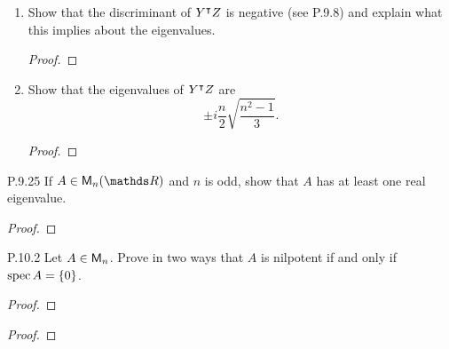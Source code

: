 \documentclass{../homework}
\begin{document}
\begin{problems}
\begin{enumerate}
    \begin{solution}
      \begin{proof}

      \end{proof}
    \end{solution}

  \item Show that the discriminant of \(Y^\intercal Z\) is negative
    (see P.9.8) and explain what this implies about the eigenvalues.

    \begin{solution}
      \begin{proof}

      \end{proof}
    \end{solution}

  \item Show that the eigenvalues of \(Y^\intercal Z\) are
    \[
      \pm i \frac n 2 \sqrt{\frac{n^2-1}{3}}.
    \]

    \begin{solution}
      \begin{proof}

      \end{proof}
    \end{solution}
  \end{enumerate}

\item[P.9.25] If \(A \in \M_n(\RR)\) and \(n\) is odd, show that \(A\)
  has at least one real eigenvalue.

  \begin{solution}
    \begin{proof}

    \end{proof}
  \end{solution}

\item[P.10.2] Let \(A \in \mathsf{M}_n\).  Prove in two ways that \(A\) is
  nilpotent if and only if \(\operatorname{spec} A = \{ {0} \}\).

  \begin{solution}
    \begin{proof}

    \end{proof}
    \begin{proof}

    \end{proof}
  \end{solution}


\end{problems}
\end{document}
